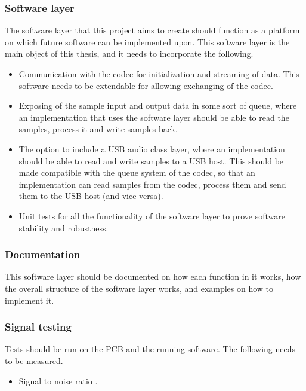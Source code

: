 \subsubsection{Software layer}

The software layer that this project aims to create should function as a platform on which future 
software can be implemented upon.
This software layer is the main object of this thesis, and it needs to incorporate the following.

\begin{itemize}
	\item Communication with the codec for initialization and streaming of data. This software needs to 
	be extendable for allowing exchanging of the codec.
	\item Exposing of the sample input and output data in some sort of queue, where an implementation 
	that uses the software layer should 
	be able to read the samples, process it and write samples back.
	\item The option to include a USB audio class layer, where an implementation should be able to read 
	and write samples to a USB host. 
	This should be made compatible with the queue system of the codec, so that an implementation can 
	read samples from the codec, 
	process them and send them to the USB host (and vice versa).
	\item Unit tests for all the functionality of the software layer to prove software stability and 
	robustness.
\end{itemize}

\subsubsection{Documentation}

This software layer should be documented on how each function in it works, how the overall structure of 
the software layer works, and examples on how to implement it.

\subsubsection{Signal testing}

Tests should be run on the PCB and the running software. The following needs to be measured.

\begin{itemize}
	\item Signal to noise ratio .
\end{itemize}
